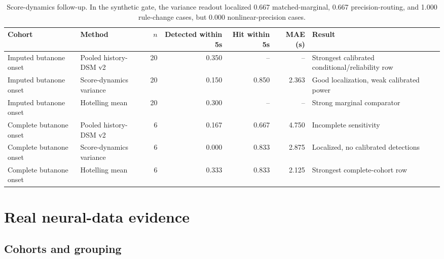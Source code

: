 \documentclass[10pt]{article}
\begin{document}
\begin{table}[H]
\centering\small
\begin{tabularx}{\linewidth}{L{2.2cm}L{2.0cm}rrrrY}
\toprule
Cohort & Method & $n$ & Detected within 5s & Hit within 5s & MAE (s) & Result \\
\midrule
Imputed butanone onset & Pooled history-DSM v2 & 20 & 0.350 & -- & -- & Strongest calibrated conditional/reliability row \\
Imputed butanone onset & Score-dynamics variance & 20 & 0.150 & 0.850 & 2.363 & Good localization, weak calibrated power \\
Imputed butanone onset & Hotelling mean & 20 & 0.300 & -- & -- & Strong marginal comparator \\
Complete butanone onset & Pooled history-DSM v2 & 6 & 0.167 & 0.667 & 4.750 & Incomplete sensitivity \\
Complete butanone onset & Score-dynamics variance & 6 & 0.000 & 0.833 & 2.875 & Localized, no calibrated detections \\
Complete butanone onset & Hotelling mean & 6 & 0.333 & 0.833 & 2.125 & Strongest complete-cohort row \\
\bottomrule
\end{tabularx}
\caption{Score-dynamics follow-up. In the synthetic gate, the variance readout localized 0.667 matched-marginal, 0.667 precision-routing, and 1.000 rule-change cases, but 0.000 nonlinear-precision cases.}
\end{table}

\section{Real neural-data evidence}

\subsection{Cohorts and grouping}
\end{document}
